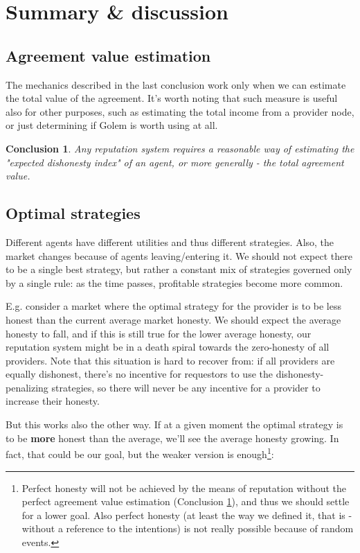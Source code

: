 \documentclass{article}
\newtheorem{conclusion}{Conclusion}[section]
\begin{document}
\section{Summary \& discussion}

\subsection{Agreement value estimation}
The mechanics described in the last conclusion work only when we can estimate the total value of the agreement.
It's worth noting that such measure is useful also for other purposes, such as estimating the total income from a provider node,
or just determining if Golem is worth using at all.

\begin{conclusion}

Any reputation system requires a reasonable way of estimating the "expected dishonesty index" of an agent, 
or more generally - the total agreement value.

\label{agreement value estimation}
\end{conclusion}

\subsection{Optimal strategies}

Different agents have different utilities and thus different strategies. 
Also, the market changes because of agents leaving/entering it. We should not expect there to be a single best strategy,
but rather a constant mix of strategies governed only by a single rule: as the time passes, profitable strategies become more common.

E.g. consider a market where the optimal strategy for the provider is to be less honest than the current average market honesty.
We should expect the average honesty to fall, and if this is still true for the lower average honesty, our reputation system might be in a death spiral towards
the zero-honesty of all providers. Note that this situation is hard to recover from: if all providers are equally dishonest, there's no incentive for requestors
to use the dishonesty-penalizing strategies, so there will never be any incentive for a provider to increase their honesty.

But this works also the other way. If at a given moment the optimal strategy is to be \textbf{more} honest than the average, 
we'll see the average honesty growing. In fact, that could be our goal, but the weaker version is enough\footnote{
    Perfect honesty will not be achieved by the means of reputation without the perfect agreement value estimation (Conclusion \ref{agreement value estimation}),
    and thus we should settle for a lower goal. Also perfect honesty (at least the way we defined it, that is - without a reference to the intentions)
    is not really possible because of random events.
}:
\end{document}
